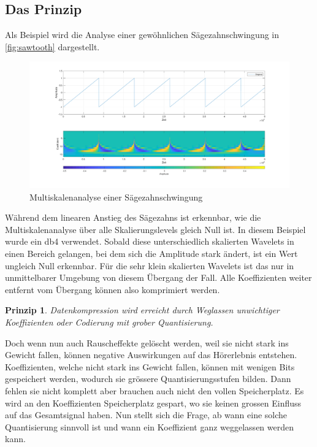\begin{refsection}
\subsection{Das Prinzip}
Als Beispiel wird die Analyse einer gewöhnlichen Sägezahnschwingung in \autoref{fig:sawtooth} dargestellt.
\begin{figure}
	\centering
	\includegraphics[width=\linewidth]{papers/compress/Bilder/sawtooth}
	\caption{Multiskalenanalyse einer Sägezahnschwingung}
	\label{fig:sawtooth}
\end{figure}
Während dem linearen Anstieg des Sägezahns ist erkennbar, wie die Multiskalenanalyse über alle Skalierungslevels gleich Null ist.
In diesem Beispiel wurde ein db4 verwendet.
Sobald diese unterschiedlich skalierten Wavelets in einen Bereich gelangen, bei dem sich die Amplitude stark ändert, ist ein Wert ungleich Null erkennbar.
Für die sehr klein skalierten Wavelets ist das nur in unmittelbarer Umgebung von diesem Übergang der Fall.
Alle Koeffizienten weiter entfernt vom Übergang können also komprimiert werden.

\newtheorem{Prinzip}{Prinzip}
\begin{Prinzip}
	Datenkompression wird erreicht durch Weglassen unwichtiger Koeffizienten oder Codierung mit grober Quantisierung.
\end{Prinzip}

Doch wenn nun auch Rauscheffekte gelöscht werden, weil sie nicht stark ins Gewicht fallen, können negative Auswirkungen auf das Hörerlebnis entstehen. 
Koeffizienten, welche nicht stark ins Gewicht fallen, können mit wenigen Bits gespeichert werden, wodurch sie grössere Quantisierungsstufen bilden. 
Dann fehlen sie nicht komplett aber brauchen auch nicht den vollen Speicherplatz.
Es wird an den Koeffizienten Speicherplatz gespart, wo sie keinen grossen Einfluss auf das Gesamtsignal haben.
Nun stellt sich die Frage, ab wann eine solche Quantisierung sinnvoll ist und wann ein Koeffizient ganz weggelassen werden kann.


\end{refsection}
